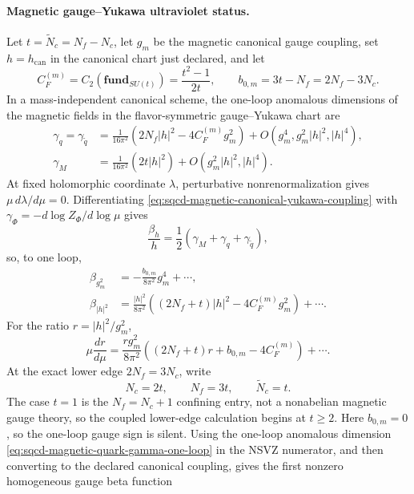 \paragraph{Magnetic gauge--Yukawa ultraviolet status.}
Let \(t=\widetilde N_c=N_f-N_c\), let \(g_m\) be the magnetic canonical gauge
coupling, set \(h=h_{\mathrm{can}}\) in the canonical chart just declared, and
let
\[
  C_F^{(m)}=C_2(\mathbf{fund}_{SU(t)})=\frac{t^2-1}{2t},
  \qquad
  b_{0,m}=3t-N_f=2N_f-3N_c .
\]
In a mass-independent canonical scheme, the one-loop anomalous dimensions of
the magnetic fields in the flavor-symmetric gauge--Yukawa chart are
\begin{align}
  \gamma_q=\gamma_{\widetilde q}
  &=
  \frac{1}{16\pi^2}
  \left(2N_f|h|^2-4C_F^{(m)}g_m^2\right)
  +O(g_m^4,g_m^2|h|^2,|h|^4),
  \label{eq:sqcd-magnetic-quark-gamma-one-loop}\\
  \gamma_M
  &=
  \frac{1}{16\pi^2}
  \left(2t|h|^2\right)
  +O(g_m^2|h|^2,|h|^4).
  \label{eq:sqcd-magnetic-meson-gamma-one-loop}
\end{align}
At fixed holomorphic coordinate \(\lambda\), perturbative
nonrenormalization gives \(\mu\,d\lambda/d\mu=0\).  Differentiating
\eqref{eq:sqcd-magnetic-canonical-yukawa-coupling} with
\(\gamma_\Phi=-d\log Z_\Phi/d\log\mu\) gives
\[
  \frac{\beta_h}{h}
  =
  \frac12(\gamma_M+\gamma_q+\gamma_{\widetilde q}),
\]
so, to one loop,
\begin{align}
  \beta_{g_m^2}
  &=
  -\frac{b_{0,m}}{8\pi^2}g_m^4+\cdots,
  \label{eq:sqcd-magnetic-gauge-beta-one-loop}\\
  \beta_{|h|^2}
  &=
  \frac{|h|^2}{8\pi^2}
  \left((2N_f+t)|h|^2-4C_F^{(m)}g_m^2\right)+\cdots .
  \label{eq:sqcd-magnetic-yukawa-beta-one-loop}
\end{align}
For the ratio \(r=|h|^2/g_m^2\),
\begin{equation}
  \mu\frac{dr}{d\mu}
  =
  \frac{r g_m^2}{8\pi^2}
  \left((2N_f+t)r+b_{0,m}-4C_F^{(m)}\right)+\cdots .
  \label{eq:sqcd-magnetic-yukawa-ratio-flow}
\end{equation}
At the exact lower edge \(2N_f=3N_c\), write
\[
  N_c=2t,\qquad N_f=3t,\qquad \widetilde N_c=t .
\]
The case \(t=1\) is the \(N_f=N_c+1\) confining entry, not a nonabelian
magnetic gauge theory, so the coupled lower-edge calculation begins at
\(t\ge2\).  Here \(b_{0,m}=0\), so the one-loop gauge sign is silent.  Using
the one-loop anomalous dimension \eqref{eq:sqcd-magnetic-quark-gamma-one-loop}
in the NSVZ numerator, and then converting to the declared canonical
coupling, gives the first nonzero homogeneous gauge beta function

